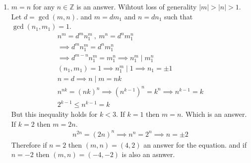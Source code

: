 \begin{enumerate}[label=]
    \item 
        $m = n$ for any $n \in \mathbb Z$ is an answer. Wihtout loss of generality $|m| > |n| > 1$. Let $d = \gcd(m, n)$. and $m = dm_1$ and $n = dn_1$ such that $\gcd(n_1, m_1) = 1$.
        \begin{gather*}
            n^m = d^m n_1^m \ , \ m^n = d^n m_1^n \\
            \implies d^m n_1^m = d^n m_1^n \\
            \implies d^{m - n} n_1^m = m_1^n 
            \implies n_1^m \mid m_1^n \\
            (n_1, m_1) = 1 \implies n_1^m \mid 1 \implies n_1 = \pm 1 \\
            n = d \implies n \mid m = nk \\
            n^{nk} = (nk)^n \implies (n^{k-1})^n = k^n \implies n^{k - 1} = k \\
            2^{k - 1} \le n^{k - 1} = k
        \end{gather*}
        But this inequality holds for $k < 3$. If $k = 1$ then $m = n$. Which is an answer. If $k = 2$ then $m = 2n$.
        \begin{gather*}
            n^{2n} = (2n)^n \implies n^n = 2^n \implies n =\pm2
        \end{gather*}
        Therefore if $n = 2$ then $(m, n) = (4, 2)$ an answer for the equation. and if $n = -2$ then $(m, n) = (-4, -2)$ is also an asnwer.
\end{enumerate}